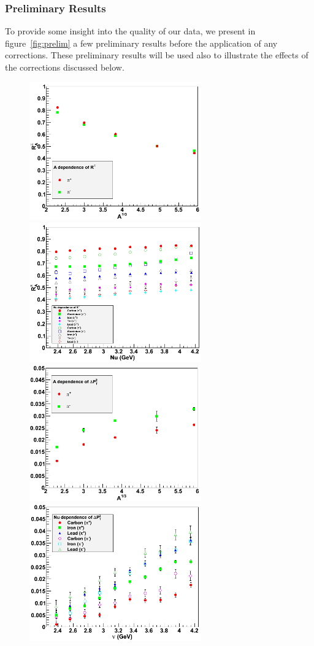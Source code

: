 \subsubsection{Preliminary Results}
\label{prelim}

To provide some insight into the quality of our data, we present in 
figure~\ref{fig:prelim} a few preliminary results before the application of 
any corrections. These preliminary results will be used also to illustrate 
the effects of the corrections discussed below.

\begin{figure}[htb]
\centering
\includegraphics[width=7.4cm] {chap5-fig/a_RvA.png} 
\includegraphics[width=7.4cm] {chap5-fig/a_RvZ.png} 
\includegraphics[width=7.4cm] {chap5-fig/a_PvA.png} 
\includegraphics[width=7.4cm] {chap5-fig/a_PvNu.png} 

\end{figure}
